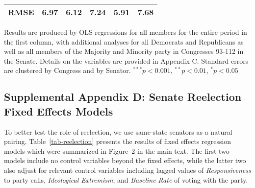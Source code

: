 \documentclass[12pt]{article}
\begin{document}
\begin{table}[H]
\begin{threeparttable}
\begin{tabular}{l c c c c c }
RMSE                  & 6.97          & 6.12         & 7.24           & 5.91         & 7.68         \\
\hline
\end{tabular}
\begin{tablenotes}
   \item
   Results are produced by OLS regressions for all members for the entire period in the first column, with additional analyses for all Democrats and Republicans as well as all members of the Majority and Minority party in Congresses 93-112 in the Senate. Details on the variables are provided in Appendix C.
   Standard errors are clustered by Congress and by Senator.
$^{***}p<0.001$, $^{**}p<0.01$, $^*p<0.05$
 \end{tablenotes}
\end{threeparttable}
\end{table}


\subsection*{Supplemental Appendix D: Senate Reelection Fixed Effects Models}
%

To better test the role of reelection, we use same-state senators as a natural pairing.  Table~\ref{tab-reelection} presents the results of fixed effects regression models which were summarized in Figure~2 in the main text.  The first two models include no control variables beyond the fixed effects, while the latter two also adjust for relevant control variables including lagged values of \textit{Responsiveness} to party calls, \textit{Ideological Extremism}, and \textit{Baseline Rate} of voting with the party.
\end{document}
